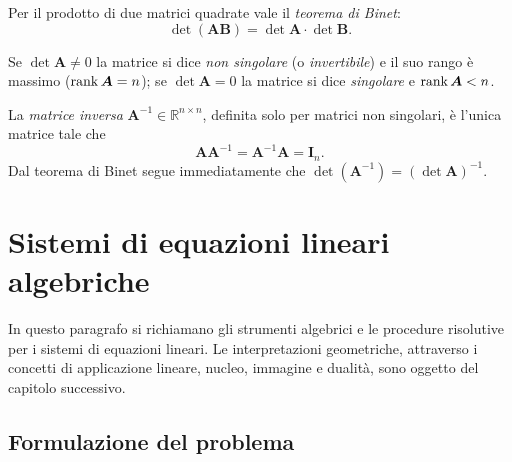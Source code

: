 Per il prodotto di due matrici quadrate vale il \textit{teorema di Binet}:
\begin{equation}\label{eq:binet}
	\det(\bm{A}\bm{B}) = \det\bm{A}\cdot\det\bm{B}.
\end{equation}

Se $\det\bm{A} \neq 0$ la matrice si dice \textit{non singolare}
(o \textit{invertibile}) e il suo rango \`e massimo ($\operatorname{rank}\bm{A}=n$);
se $\det\bm{A} = 0$ la matrice si dice \textit{singolare} e $\operatorname{rank}\bm{A}<n$.

La \textit{matrice inversa} $\bm{A}^{-1} \in \mathbb{R}^{n \times n}$,
definita solo per matrici non singolari, \`e l'unica matrice tale che
\begin{equation}
	\bm{A}\bm{A}^{-1} = \bm{A}^{-1}\bm{A} = \bm{I}_n.
\end{equation}
Dal teorema di Binet segue immediatamente che
$\det(\bm{A}^{-1}) = (\det\bm{A})^{-1}$.



\section{Sistemi di equazioni lineari algebriche}\label{sec:sistemi_lineari}


In questo paragrafo si richiamano gli strumenti algebrici e le 
procedure risolutive per i sistemi di equazioni lineari. Le 
interpretazioni geometriche, attraverso i concetti di applicazione 
lineare, nucleo, immagine e dualità, sono oggetto del capitolo
successivo.



\subsection{Formulazione del problema}

